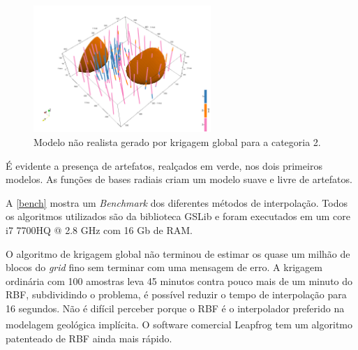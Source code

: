 \begin{figure}[H]
	\caption{\label{global_krig}Modelo não realista gerado por krigagem global para a categoria 2.}
	\begin{center}
		\includegraphics[width=0.6\textwidth]{capitulo_2/globalind2.png}
	\end{center}
\end{figure}

É evidente a presença de artefatos, realçados em verde, nos dois primeiros modelos. As funções de bases radiais criam um modelo suave e livre de artefatos. 

A \autoref{bench} mostra um \textit{Benchmark} dos diferentes métodos de interpolação. Todos os algoritmos utilizados são da biblioteca GSLib e foram executados em um core i7 7700HQ @ 2.8 GHz com 16 Gb de RAM.

O algoritmo de krigagem global não terminou de estimar os quase um milhão de blocos do \textit{grid} fino sem terminar com uma mensagem de erro. A krigagem ordinária com 100 amostras leva 45 minutos contra pouco mais de um minuto do RBF, subdividindo o problema, é possível reduzir o tempo de interpolação para 16 segundos. Não é difícil perceber porque o RBF é o interpolador preferido na modelagem geológica implícita. O software comercial Leapfrog \textsuperscript{\textregistered} tem um algoritmo patenteado de RBF ainda mais rápido.


